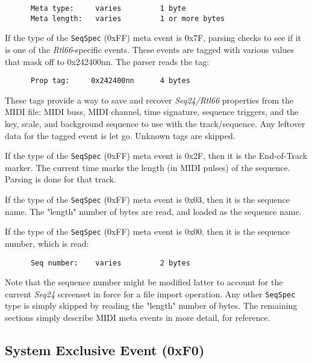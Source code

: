    \begin{verbatim}
      Meta type:     varies         1 byte
      Meta length:   varies         1 or more bytes
   \end{verbatim}

   If the type of the
   \texttt{SeqSpec} (0xFF) meta event is 0x7F, parsing checks to see
   if it is one of the \textsl{Rtl66}-specific events.  These events are tagged
   with various values that mask off to 0x242400nn.  The parser reads the
   tag:

   \begin{verbatim}
      Prop tag:     0x242400nn      4 bytes
   \end{verbatim}

   These tags provide a way to save and recover \textsl{Seq24/Rtl66} properties
   from the MIDI file: MIDI buss, MIDI channel, time signature, sequence
   triggers, and the key, scale, and background sequence to use with the
   track/sequence.  Any leftover data for the tagged event is let go.
   Unknown tags are skipped.

   If the type of the
   \texttt{SeqSpec} (0xFF) meta event is 0x2F, then it is the
   End-of-Track marker.  The current time marks the length (in MIDI pulses) of
   the sequence.  Parsing is done for that track.

   If the type of the
   \texttt{SeqSpec} (0xFF) meta event is 0x03, then it is the
   sequence name.  The "length" number of bytes are read, and loaded as the
   sequence name.

   If the type of the
   \texttt{SeqSpec} (0xFF) meta event is 0x00, then it is the
   sequence number, which is read:

   \begin{verbatim}
      Seq number:    varies         2 bytes
   \end{verbatim}

   Note that the sequence number might be modified latter to account for the
   current \textsl{Seq24} screenset in force for a file import operation.
   Any other \texttt{SeqSpec} type is simply skipped by reading the "length"
   number of bytes.
   The remaining sections simply describe MIDI meta events in more detail, for
   reference.

\subsection{System Exclusive Event (0xF0)}
\label{subsec:midi_meta_sysex_event}


